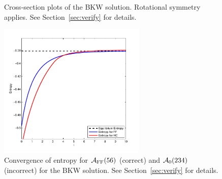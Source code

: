 \begin{figure}
    \centering
    \caption{Cross-section plots of the BKW solution. Rotational symmetry applies. See
    Section~\vref{sec:verify} for details.}
    \label{fig:bkw:sols}
\end{figure}

\begin{figure}
    \centering
    \includegraphics[width=7cm]{figs/hcboltz/entropy}
    \caption{Convergence of entropy for $\mathcal{A}_\text{FF}(56)$ (correct) and $\mathcal{A}_0(234)$ (incorrect) for the BKW
    solution. See Section~\vref{sec:verify} for details.}
    \label{fig:entropy}
\end{figure}

